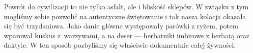
Powrót do cywilizacji to nie tylko asfalt, ale i bliskość sklepów. W związku z tym mogliśmy sobie pozwolić na autentyczne świętowanie i tak nasza kolacja okazała się być trzydaniowa. Jako danie główne występowały parówki z ryżem, potem wparował kuskus z~warzywami, a na deser --- herbatniki imbirowe z herbatą oraz daktyle. W ten sposób pozbyliśmy się właściwie dokumentnie całej żywności.


